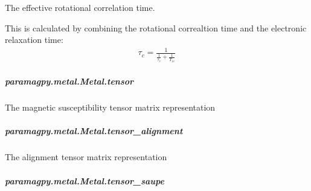 \documentclass[a4paper,10pt,english]{sphinxmanual}
\begin{document}
\begin{fulllineitems}
\begin{fulllineitems}
\begin{fulllineitems}
\label{\detokenize{reference/generated/paramagpy.metal.Metal.tauc:paramagpy.metal.Metal.tauc}}
The effective rotational correlation time.

This is calculated by combining the rotational correaltion time
and the electronic relaxation time:
\begin{equation*}
\begin{split}\tau_c = \frac{1}{\frac{1}{\tau_r}+\frac{1}{T_{1e}}}\end{split}
\end{equation*}
\end{fulllineitems}



\subparagraph{paramagpy.metal.Metal.tensor}
\label{\detokenize{reference/generated/paramagpy.metal.Metal.tensor:paramagpy-metal-metal-tensor}}\label{\detokenize{reference/generated/paramagpy.metal.Metal.tensor::doc}}

\begin{fulllineitems}
\label{\detokenize{reference/generated/paramagpy.metal.Metal.tensor:paramagpy.metal.Metal.tensor}}
The magnetic susceptibility tensor matrix representation

\end{fulllineitems}



\subparagraph{paramagpy.metal.Metal.tensor\_alignment}
\label{\detokenize{reference/generated/paramagpy.metal.Metal.tensor_alignment:paramagpy-metal-metal-tensor-alignment}}\label{\detokenize{reference/generated/paramagpy.metal.Metal.tensor_alignment::doc}}

\begin{fulllineitems}
\label{\detokenize{reference/generated/paramagpy.metal.Metal.tensor_alignment:paramagpy.metal.Metal.tensor_alignment}}
The alignment tensor matrix representation

\end{fulllineitems}



\subparagraph{paramagpy.metal.Metal.tensor\_saupe}
\label{\detokenize{reference/generated/paramagpy.metal.Metal.tensor_saupe:paramagpy-metal-metal-tensor-saupe}}\label{\detokenize{reference/generated/paramagpy.metal.Metal.tensor_saupe::doc}}


\end{fulllineitems}
\end{fulllineitems}
\end{document}
